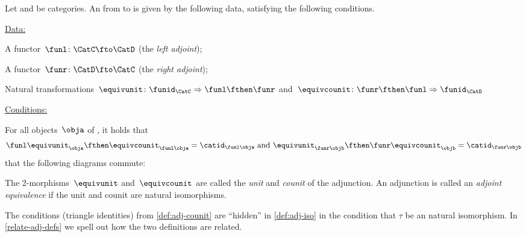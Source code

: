 \begin{ctdefinition}
  \label{def:adj-counit}
  \label{def:cat-adjunction-v2}
  Let \CatC and \CatD be categories. An \emph{} from \CatC to \CatD is given by the following data, satisfying the following conditions.

  \underline{Data:}
  \begin{compactenum}
    \item A functor~$\funl \colon \CatC \fto \CatD$ (the \emph{left adjoint});
    \item A functor~$\funr \colon \CatD \fto \CatC$ (the \emph{right adjoint});
    \item Natural transformations~$\equivunit \colon \funid_\CatC \Rightarrow \funl  \fthen \funr $ and~$\equivcounit\colon \funr \fthen \funl \Rightarrow \funid_\CatD$
  \end{compactenum}

  \underline{Conditions:}
  \begin{compactenum}
    \item For all objects~$\obja$ of \CatC, it holds that
    \begin{equation*}
      \funl \equivunit_\obja \fthen \equivcounit_{\funl\obja} = \catid_{\funl\obja} \text{ and }
      \equivunit_{\funr\objb} \fthen \funr\equivcounit_\objb = \catid_{\funr\objb}
    \end{equation*}
    \text{\ie } that the following diagrams commute:
    \begin{center}
    \end{center}
  \end{compactenum}

  The 2-morphisms~$\equivunit$ and~$\equivcounit$ are called the \emph{unit} and \emph{counit} of the adjunction.
  An adjunction is called an \emph{adjoint equivalence} if the unit and counit are natural isomorphisms.
\end{ctdefinition}

\begin{remark}
  The conditions (triangle identities) from \cref{def:adj-counit} are ``hidden'' in \cref{def:adj-iso} in the condition that $\tau$ be an natural isomorphism. In \cref{relate-adj-defs} we spell out how the two definitions are related.
\end{remark}
